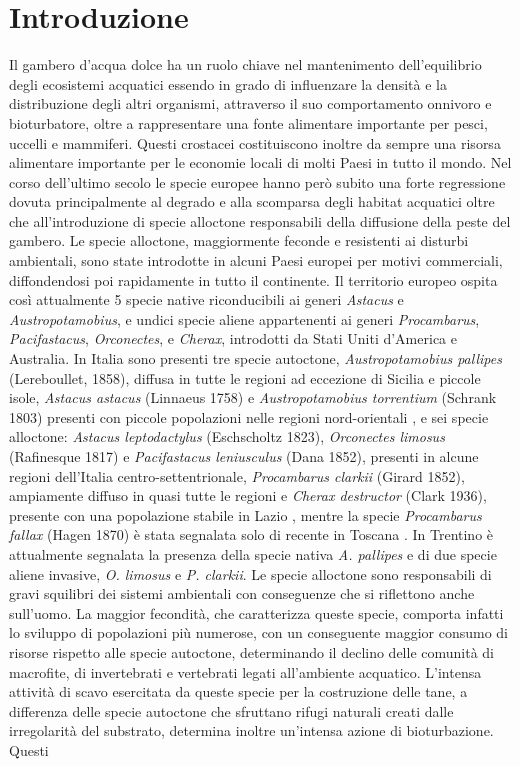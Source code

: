 \documentclass[11pt,a4paper,italian,twoside,openany]{memoir}
\newcommand\BackgroundPicTwo{
  \put(0,0){
    \parbox[b][\paperheight]{\paperwidth}{%
      \vfill
      \centering
      \texttt{[image: 2.pdf]}
      \vfill
    }
  }
}
\begin{document}
\chapter{Introduzione}
\AddToShipoutPicture*{\BackgroundPicTwo}
\label{chap_intro}
Il gambero d'acqua dolce ha un ruolo chiave nel mantenimento dell'equilibrio degli ecosistemi acquatici essendo in grado di influenzare la densità e la distribuzione degli altri organismi, attraverso il suo comportamento onnivoro e bioturbatore, oltre a rappresentare una fonte alimentare importante per pesci, uccelli e mammiferi. Questi crostacei costituiscono inoltre da sempre una risorsa alimentare importante per le economie locali di molti Paesi in tutto il mondo. Nel corso dell'ultimo secolo le specie europee hanno però subito una forte regressione dovuta principalmente al degrado e alla scomparsa degli habitat acquatici oltre che all'introduzione di specie alloctone responsabili della diffusione della peste del gambero. Le specie alloctone, maggiormente feconde e resistenti ai disturbi ambientali, sono state introdotte in alcuni Paesi europei per motivi commerciali, diffondendosi poi rapidamente in tutto il continente. Il territorio europeo ospita così attualmente 5 specie native riconducibili ai generi \emph{Astacus} e \emph{Austropotamobius}, e undici specie aliene appartenenti ai generi \emph{Procambarus}, \emph{Pacifastacus}, \emph{Orconectes}, e \emph{Cherax}, introdotti da Stati Uniti d'America e Australia. In Italia sono presenti tre specie autoctone, \emph{Austropotamobius pallipes} (Lereboullet, 1858), diffusa in tutte le regioni ad eccezione di Sicilia e piccole isole, \emph{Astacus astacus} (Linnaeus 1758) e \emph{Austropotamobius torrentium} (Schrank 1803) presenti con piccole popolazioni nelle regioni nord-orientali \cite{De Luise 2006} \cite{Fureder 2007} \cite{Aquiloni 2010}, e sei specie alloctone: \emph{Astacus leptodactylus} (Eschscholtz 1823), \emph{Orconectes limosus} (Rafinesque 1817) e \emph{Pacifastacus leniusculus} (Dana 1852), presenti in alcune regioni dell'Italia centro-settentrionale, \emph{Procambarus clarkii} (Girard 1852), ampiamente diffuso in quasi tutte le regioni \cite{Kouba 2014} e \emph{Cherax destructor} (Clark 1936), presente con una popolazione stabile in Lazio \cite{Scalici 2009}, mentre la specie \emph{Procambarus fallax} (Hagen 1870) è stata segnalata solo di recente in Toscana \cite{Nonnis Marzano 2009}. In Trentino è attualmente segnalata la presenza della specie nativa \emph{A. pallipes} e di due specie aliene invasive, \emph{O. limosus} e \emph{P. clarkii}. Le specie alloctone sono responsabili di gravi squilibri dei sistemi ambientali con conseguenze che si riflettono anche sull'uomo. La maggior fecondità, che caratterizza queste specie, comporta infatti lo sviluppo di popolazioni più numerose, con un conseguente maggior consumo di risorse rispetto alle specie autoctone, determinando il declino delle comunità di macrofite, di invertebrati e vertebrati legati all'ambiente acquatico. L'intensa attività di scavo esercitata da queste specie per la costruzione delle tane, a differenza delle specie autoctone che sfruttano rifugi naturali creati dalle irregolarità del substrato, determina inoltre un'intensa azione di bioturbazione. Questi 
\end{document}
